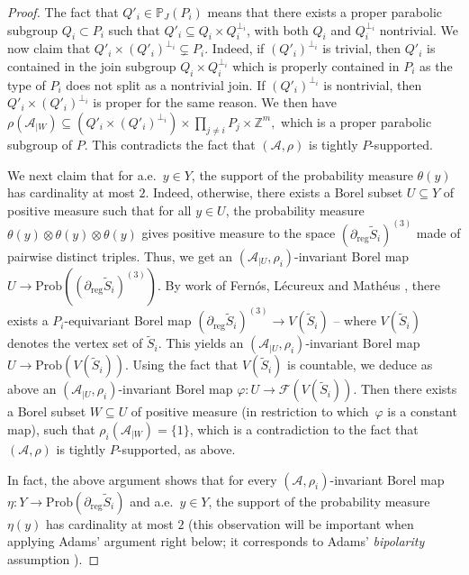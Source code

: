 \documentclass[JEP,XML,SOM,Unicode,NoFloatCountersInSection,published]{cedram}
\let\mathcal\mathscr
\theoremstyle{plain}
\theoremstyle{definition}
\newcommand{\cala}{\mathcal{A}}
\newcommand{\calf}{\mathcal{F}}
\newcommand{\Prob}{\mathrm{Prob}}
\newcommand{\reg}{\mathrm{reg}}
\begin{document}
\begin{proof}
The fact that $Q'_i\in\mathbb{P}_J(P_i)$ means that there exists a proper parabolic subgroup $Q_i\subset P_i$ such that $Q'_i\subseteq Q_i\times Q_i^{\perp_i}$, with both $Q_i$ and $Q_i^{\perp_i}$ nontrivial.
We now claim that $Q'_i\times (Q'_i)^{\perp_i}\subsetneq P_i$. Indeed, if $(Q'_i)^{\perp_i}$ is trivial, then $Q'_i$ is contained in the join subgroup $Q_i\times Q_i^{\perp_i}$ which is properly contained in $P_i$ as the type of $P_i$ does not split as a nontrivial join. If $(Q'_i)^{\perp_i}$ is nontrivial, then $Q'_i\times (Q'_i)^{\perp_i}$ is proper for the same reason. We then have $\rho(\cala_{|W})\subseteq (Q'_i\times (Q'_i)^{\perp_i})\times\prod_{j\neq i} P_j\times \mathbb{Z}^m,$ which is a proper parabolic subgroup of $P$. This contradicts the fact that $(\cala,\rho)$ is tightly $P$-supported.

We next claim that for a.e.\ $y\in Y$, the support of the probability measure $\theta(y)$ has cardinality at most $2$. Indeed, otherwise, there exists a Borel subset $U\subseteq Y$ of positive measure such that for all $y\in U$, the probability measure $\theta(y)\otimes\theta(y)\otimes\theta(y)$ gives positive measure to the space $(\partial_\reg \widetilde{S}_i)^{(3)}$ made of pairwise distinct triples. Thus, we get an $(\cala_{|U},\rho_i)$-invariant Borel map $U\to \Prob((\partial_\reg \widetilde{S}_i)^{(3)})$. By work of Fernós, Lécureux and Mathéus \cite[Lem.\,5.14 \&~6.21]{FLM}, there exists a $P_i$-equivariant Borel map $(\partial_\reg \widetilde{S}_i)^{(3)}\to V(\widetilde{S}_i)$ -- where $V(\widetilde{S}_i)$ denotes the vertex set of $\widetilde{S}_i$.
This yields an $(\cala_{|U},\rho_i)$-invariant Borel map $U\to \Prob(V(\widetilde{S}_i))$. Using the fact that $V(\widetilde{S}_i)$ is countable, we deduce as above an $(\cala_{|U},\rho_i)$-invariant Borel map $\varphi:U\to\calf(V(\widetilde{S}_i))$. Then there exists a Borel subset $W\subseteq U$ of positive measure (in restriction to which~$\varphi$ is a constant map), such that $\rho_i(\cala_{|W})=\{1\}$, which is a contradiction to the fact that $(\cala,\rho)$ is tightly $P$-supported, as above.

In fact, the above argument shows that for every $(\cala,\rho_i)$-invariant Borel map $\eta:Y\to\Prob(\partial_\reg \widetilde{S}_i)$ and a.e.\ $y\in Y$, the support of the probability measure $\eta(y)$ has cardinality at most $2$ (this observation will be important when applying Adams' argument right below; it corresponds to Adams' \emph{bipolarity} assumption \cite[Def.\,3.1]{Ada}).\enlargethispage{\baselineskip}%


\end{proof}
\end{document}

